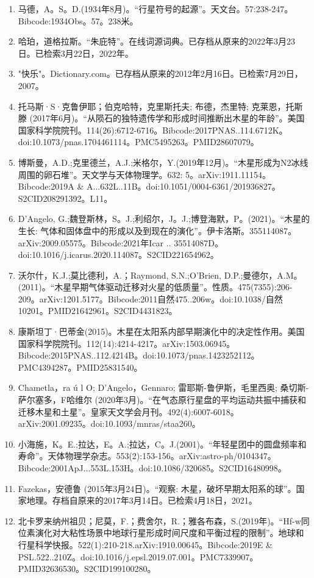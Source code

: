 \begin{enumerate}
\item 马德，A。S。D.(1934年8月)。“行星符号的起源”。天文台。57:238-247。Bibcode:1934Obs。57。238米。
\item 哈珀，道格拉斯。“朱庇特”。在线词源词典。已存档从原来的2022年3月23日。已检索3月22日，2022年。
\item "快乐"。Dictionary.com。已存档从原来的2012年2月16日。已检索7月29日，2007。
\item 托马斯·S·克鲁伊耶；伯克哈特，克里斯托夫; 布德，杰里特; 克莱恩，托斯滕 (2017年6月)。“从陨石的独特遗传学和形成时间推断出木星的年龄”。美国国家科学院院刊。114(26):6712-6716。Bibcode:2017PNAS..114.6712K。doi:10.1073/pnas.1704461114。PMC5495263。PMID28607079。  
\item 博斯曼，A.D.;克里德兰，A.J.;米格尔，Y.(2019年12月)。“木星形成为N2冰线周围的卵石堆”。天文学与天体物理学。632: 5。arXiv:1911.11154。Bibcode:2019A & A...632L..11B。doi:10.1051/0004-6361/201936827。S2CID208291392。L11。 
\item D'Angelo, G.;魏登斯林，S。J.;利绍尔，J。J.;博登海默，P。(2021)。“木星的生长: 气体和固体盘中的形成以及到现在的演化”。伊卡洛斯。355114087。arXiv:2009.05575。Bibcode:2021年Icar .. 35514087D。doi:10.1016/j.icarus.2020.114087。S2CID221654962。 
\item 沃尔什，K.J.;莫比德利，A.；Raymond, S.N.;O'Brien, D.P.;曼德尔，A.M。(2011)。“木星早期气体驱动迁移对火星的低质量”。性质。475(7355):206-209。arXiv:1201.5177。Bibcode:2011自然475..206w。doi:10.1038/自然10201。PMID21642961。S2CID4431823。  
\item 康斯坦丁·巴蒂金(2015)。木星在太阳系内部早期演化中的决定性作用。美国国家科学院院刊。112(14):4214-4217。arXiv:1503.06945。Bibcode:2015PNAS..112.4214B。doi:10.1073/pnas.1423252112。PMC4394287。PMID25831540。  
\item Chametla，ra ú l O; D'Angelo，Gennaro; 雷耶斯-鲁伊斯，毛里西奥; 桑切斯-萨尔塞多，F哈维尔 (2020年3月)。“在气态原行星盘的平均运动共振中捕获和迁移木星和土星”。皇家天文学会月刊。492(4):6007-6018。arXiv:2001.09235。doi:10.1093/mnras/staa260。
\item 小海施，K。E.;拉达，E。A.;拉达，C。J.(2001)。“年轻星团中的圆盘频率和寿命”。天体物理学杂志。553(2):153-156。arXiv:astro-ph/0104347。Bibcode:2001ApJ...553L.153H。doi:10.1086/320685。S2CID16480998。 
\item Fazekas，安德鲁 (2015年3月24日)。“观察: 木星，破坏早期太阳系的球”。国家地理。存档自原来的2017年3月14日。已检索4月18日，2021。
\item 北卡罗来纳州祖贝；尼莫，F.；费舍尔，R.；雅各布森，S.(2019年)。“Hf-w同位素演化对大粘性场景中地球行星形成时间尺度和平衡过程的限制”。地球和行星科学快报。522(1):210-218.arXiv:1910.00645。Bibcode:2019E & PSL.522..210Z。doi:10.1016/j.epsl.2019.07.001。PMC7339907。PMID32636530。S2CID199100280。   

\end{enumerate}
